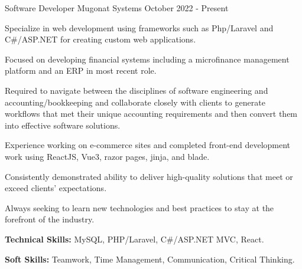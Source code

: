 

\begin{cventries}
  \cventry
    {Software Developer}                   %
    {Mugonat Systems}   %
    {}              %
    {October 2022 - Present}              %
    {
      \begin{cvitems} %
        \item
                    {
                        Specialize in web development using frameworks such as Php/Laravel and C\#/ASP.NET for creating custom web applications.
                    }
                    \item
                    {
                        Focused on developing financial systems including a microfinance management platform and an ERP in most recent role.
                    }
                    \item
                    {
                        Required to navigate between the disciplines of software engineering and accounting/bookkeeping and collaborate closely with clients to generate workflows that met their unique accounting requirements and then convert them into effective software solutions.
                    }
                    \item
                    {
                        Experience working on e-commerce sites and completed front-end development work using ReactJS, Vue3, razor pages, jinja, and blade.
                    }
                    \item
                    {
                        Consistently demonstrated ability to deliver high-quality solutions that meet or exceed clients' expectations.
                    }
                    \item
                    {
                        Always seeking to learn new technologies and best practices to stay at the forefront of the industry.
                    }
        \item {\textbf{Technical Skills:} MySQL, PHP/Laravel, C\#/ASP.NET MVC, React.}
        \item {\textbf{Soft Skills:} Teamwork, Time Management, Communication, Critical Thinking.}
      \end{cvitems}
    }


\end{cventries}
